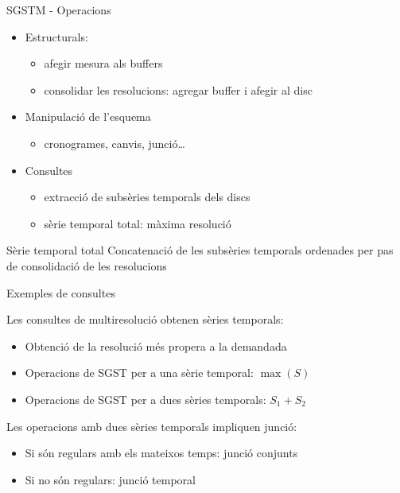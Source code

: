 \begin{frame}{SGSTM - Operacions}

  \begin{itemize}
  \item Estructurals: 
    \begin{itemize}
    \item afegir mesura als buffers 
    \item consolidar les resolucions: agregar buffer i afegir al disc
    \end{itemize}

  \item Manipulació de l'esquema
    \begin{itemize}
    \item cronogrames, canvis, junció\dots
    \end{itemize}

  \item Consultes
    \begin{itemize}
    \item extracció de subsèries temporals dels discs
    \item sèrie temporal total: màxima resolució
    \end{itemize}

  \end{itemize}


\begin{block}{Sèrie temporal total}
Concatenació de les subsèries temporals ordenades per pas de consolidació de les resolucions
\end{block}

\end{frame}



\begin{frame}{Exemples de consultes}

Les consultes de multiresolució obtenen sèries temporals:

\begin{itemize}
\item Obtenció de la resolució més propera a la demandada
\item Operacions de SGST per a una sèrie temporal: $\max(S)$
\item Operacions de SGST per a dues sèries temporals: $S_1 + S_2$
\end{itemize}

Les operacions amb dues sèries temporals impliquen junció:

\begin{itemize}
\item Si són regulars amb els mateixos temps: junció conjunts
\item Si no són regulars: junció temporal
\end{itemize}


\end{frame}



